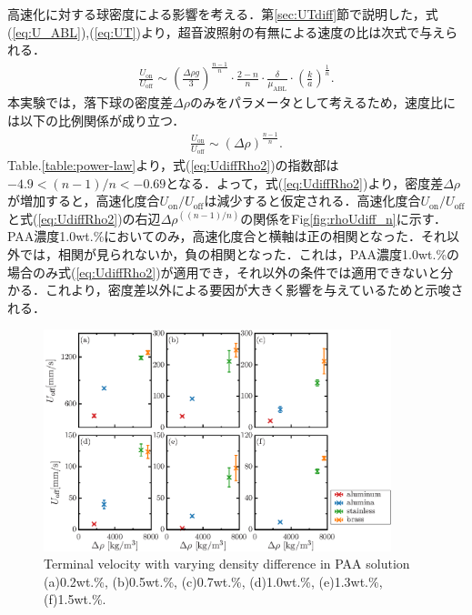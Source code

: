 高速化に対する球密度による影響を考える．第\ref{sec:UTdiff}節で説明した，式(\ref{eq:U_ABL}),(\ref{eq:UT})より，超音波照射の有無による速度の比は次式で与えられる．
\begin{eqnarray}
    \frac{U_\text{on}}{U_\text{off}} \sim \left(\frac{\Delta\rho{}g}{3}\right)^{\frac{n-1}{n}}\cdot\frac{2-n}{n}\cdot\frac{\delta}{\mu_\text{ABL}}\cdot\left(\frac{k}{a}\right)^{\frac{1}{n}} .
    \label{eq:UdiffRho}
\end{eqnarray}
本実験では，落下球の密度差$\Delta\rho$のみをパラメータとして考えるため，速度比には以下の比例関係が成り立つ．
\begin{eqnarray}
    \frac{U_\text{on}}{U_\text{off}} \sim \left(\Delta\rho{}\right)^{\frac{n-1}{n}} .
    \label{eq:UdiffRho2}
\end{eqnarray}
Table.\ref{table:power-law}より，式(\ref{eq:UdiffRho2})の指数部は$-4.9<(n-1)/n<-0.69$となる．よって，式(\ref{eq:UdiffRho2})より，密度差$\Delta\rho$が増加すると，高速化度合$U_\text{on}/U_\text{off}$は減少すると仮定される．高速化度合$U_\text{on}/U_\text{off}$と式(\ref{eq:UdiffRho2})の右辺$\Delta\rho^{\left(\left(n-1\right)/n\right)}$の関係をFig\ref{fig:rhoUdiff_n}に示す．PAA濃度1.0wt.\%においてのみ，高速化度合と横軸は正の相関となった．それ以外では，相関が見られないか，負の相関となった．これは，PAA濃度1.0wt.\%の場合のみ式(\ref{eq:UdiffRho2})が適用でき，それ以外の条件では適用できないと分かる．これより，密度差以外による要因が大きく影響を与えているためと示唆される．

\begin{figure}[ht]
    \centering
    \includegraphics[width=0.9\textwidth]{./5-Results/rhoUT.eps}
    \caption{Terminal velocity with varying density difference in PAA solution (a)0.2wt.\%, (b)0.5wt.\%, (c)0.7wt.\%, (d)1.0wt.\%, (e)1.3wt.\%, (f)1.5wt.\%.}
    \label{fig:rhoUT}
\end{figure}

